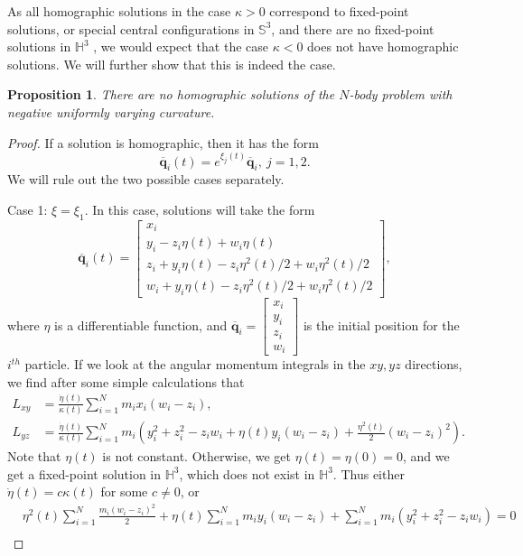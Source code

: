 \documentclass[12pt]{amsart}
\newtheorem{proposition}{Proposition}
\theoremstyle{definition}
\def \mb{\mathbb}
\def \S{\mb S}        %
\def \H{\mb H}        %
\newcommand {\q} {\mathbf{q}}
\begin{document}
{As all homographic solutions in the case $\kappa>0$ correspond to fixed-point solutions, or special central configurations in $\S^3$, and there are no fixed-point solutions in $\H^3$ \cite{Diacu3, DiacuZhu}, we would expect that the case $\kappa<0$ does not have homographic solutions. We will further show that this is indeed the case.
\begin{proposition}
There are no homographic solutions of the $N$-body problem with negative uniformly varying curvature.
\end{proposition}
\begin{proof}
If a solution is  homographic, then it has the form 
$$
\overline{\q}_i(t)=e^{\xi_j(t)}\overline{\q}_i, \ j=1,2.
$$ We will rule out the two possible cases separately.
\smallskip

Case 1: $\xi=\xi_1$. In this case, solutions will take the form 
$$\overline{\q}_i(t)=\begin{bmatrix} x_i \\ y_i-z_i\eta(t)+w_i\eta(t)\\ z_i+y_i\eta(t)-z_i\eta^2(t)/2+w_i\eta^2(t)/2\\ w_i + y_i\eta(t)-z_i\eta^2(t)/2+w_i\eta^2(t)/2\end{bmatrix},$$
 where $\eta$ is a differentiable function, and $\overline{\q}_i=\begin{bmatrix}x_i\\y_i\\z_i\\w_i\end{bmatrix}$ is the initial position for the $i^{th}$ particle. If we look at the angular momentum integrals in the $xy, yz$ directions, we find after some simple calculations that \begin{align}
L_{xy}&=\frac{\dot{\eta}(t)}{\kappa(t)}\sum\limits_{i=1}^Nm_ix_i(w_i-z_i)\label{xy},\\
L_{yz}&=\frac{\dot{\eta}(t)}{\kappa(t)}\sum\limits_{i=1}^Nm_i(y_i^2+z_i^2-z_iw_i+\eta(t)y_i(w_i-z_i)+\frac{\eta^2(t)}{2}(w_i-z_i)^2).\label{yz}
\end{align}
Note that $\eta(t)$ is not constant. Otherwise, we get $\eta(t)=\eta(0)=0$, and we get a fixed-point solution in $\H^3$, which does not exist in $\H^3$\cite{Diacu3, DiacuZhu}. Thus either $\dot{\eta}(t)=c\kappa(t)$ for some $c \neq 0$, or \begin{align*}&\eta^2(t)\sum\limits_{i=1}^N\frac{m_i(w_i-z_i)^2}{2}+\eta(t)\sum\limits_{i=1}^N m_iy_i(w_i-z_i)+\sum\limits_{i=1}^Nm_i(y_i^2+z_i^2-z_iw_i)=0\\

\end{align*}
\end{proof}}
\end{document}
